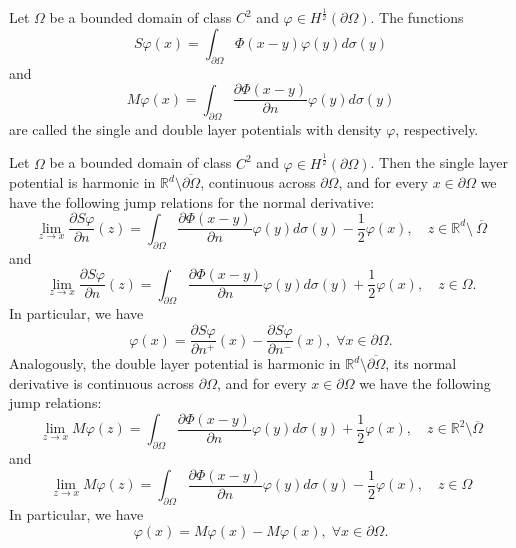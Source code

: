 \begin{definition}\label{definition_single_and_double_layer_potentials}
    Let \(\Omega\) be a bounded domain of class \(C^2\) and \(\varphi \in H^\frac{1}{2}(\partial\Omega)\). The functions
    \[
        S\varphi(x) = \int_{\partial\Omega} \Phi(x-y)\varphi(y) d\sigma(y)
    \]
    and
    \[
        M\varphi(x) = \int_{\partial\Omega} \frac{\partial \Phi(x-y)}{\partial n}\varphi(y) d\sigma(y)
    \]
    are called the single and double layer potentials with density \(\varphi\), respectively.
\end{definition}
\begin{proposition}\label{sl_jump}
    Let \(\Omega\) be a bounded domain of class \(C^2\) and \(\varphi \in H^\frac{1}{2}(\partial\Omega)\). Then the single layer potential is harmonic in \(\mathbb{R}^d\setminus \overline{\partial\Omega}\), continuous across \(\partial\Omega\), and for every \(x \in \partial\Omega\) we have the following jump relations for the normal derivative:
    \[
        \lim_{z \rightarrow x} \frac{\partial S\varphi}{\partial n}(z) = \int_{\partial\Omega} \frac{\partial\Phi(x-y)}{\partial n}\varphi(y) d\sigma(y) - \frac{1}{2}\varphi(x), \quad z \in \mathbb{R}^d \setminus \ \overline{\Omega}
    \]
    and
    \[
        \lim_{z \rightarrow x} \frac{\partial S\varphi}{\partial n}(z) = \int_{\partial\Omega} \frac{\partial\Phi(x-y)}{\partial n}\varphi(y) d\sigma(y) + \frac{1}{2}\varphi(x), \quad z \in \Omega.
    \]
    In particular, we have
    \[
        \varphi(x) = \frac{\partial S\varphi}{\partial n^+}(x)-\frac{\partial S\varphi}{\partial n^-}(x), \; \forall x \in \partial\Omega.
    \]
    Analogously, the double layer potential is harmonic in \(\mathbb{R}^d\setminus \overline{\partial\Omega}\), its normal derivative is continuous across \(\partial\Omega\), and for every \(x \in \partial\Omega\) we have the following jump relations:
    \[
        \lim_{z \rightarrow x} M\varphi(z) = \int_{\partial\Omega} \frac{\partial\Phi(x-y)}{\partial n}\varphi(y) d\sigma(y) + \frac{1}{2}\varphi(x), \quad z \in \mathbb{R}^2\setminus\overline{\Omega}
    \]
    and
    \[
        \lim_{z \rightarrow x} M\varphi(z) = \int_{\partial\Omega} \frac{\partial\Phi(x-y)}{\partial n}\varphi(y) d\sigma(y) - \frac{1}{2}\varphi(x), \quad z \in \Omega
    \]
    In particular, we have
    \[
        \varphi(x) = M\varphi(x)-M\varphi(x), \; \forall x \in \partial\Omega.
    \]



\end{proposition}
